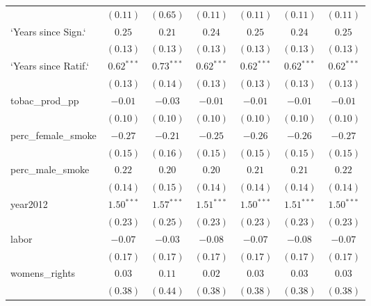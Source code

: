 \begin{table}[!h]
\begin{center}
\begin{tabular}{l c c c c c c }
                        & $(0.11)$     & $(0.65)$     & $(0.11)$     & $(0.11)$     & $(0.11)$     & $(0.11)$     \\
`Years since Sign.`     & $0.25$       & $0.21$       & $0.24$       & $0.25$       & $0.24$       & $0.25$       \\
                        & $(0.13)$     & $(0.13)$     & $(0.13)$     & $(0.13)$     & $(0.13)$     & $(0.13)$     \\
`Years since Ratif.`    & $0.62^{***}$ & $0.73^{***}$ & $0.62^{***}$ & $0.62^{***}$ & $0.62^{***}$ & $0.62^{***}$ \\
                        & $(0.13)$     & $(0.14)$     & $(0.13)$     & $(0.13)$     & $(0.13)$     & $(0.13)$     \\
tobac\_prod\_pp         & $-0.01$      & $-0.03$      & $-0.01$      & $-0.01$      & $-0.01$      & $-0.01$      \\
                        & $(0.10)$     & $(0.10)$     & $(0.10)$     & $(0.10)$     & $(0.10)$     & $(0.10)$     \\
perc\_female\_smoke     & $-0.27$      & $-0.21$      & $-0.25$      & $-0.26$      & $-0.26$      & $-0.27$      \\
                        & $(0.15)$     & $(0.16)$     & $(0.15)$     & $(0.15)$     & $(0.15)$     & $(0.15)$     \\
perc\_male\_smoke       & $0.22$       & $0.20$       & $0.20$       & $0.21$       & $0.21$       & $0.22$       \\
                        & $(0.14)$     & $(0.15)$     & $(0.14)$     & $(0.14)$     & $(0.14)$     & $(0.14)$     \\
year2012                & $1.50^{***}$ & $1.57^{***}$ & $1.51^{***}$ & $1.50^{***}$ & $1.51^{***}$ & $1.50^{***}$ \\
                        & $(0.23)$     & $(0.25)$     & $(0.23)$     & $(0.23)$     & $(0.23)$     & $(0.23)$     \\
labor                   & $-0.07$      & $-0.03$      & $-0.08$      & $-0.07$      & $-0.08$      & $-0.07$      \\
                        & $(0.17)$     & $(0.17)$     & $(0.17)$     & $(0.17)$     & $(0.17)$     & $(0.17)$     \\
womens\_rights          & $0.03$       & $0.11$       & $0.02$       & $0.03$       & $0.03$       & $0.03$       \\
                        & $(0.38)$     & $(0.44)$     & $(0.38)$     & $(0.38)$     & $(0.38)$     & $(0.38)$     \\

\end{tabular}
\end{center}
\end{table}
